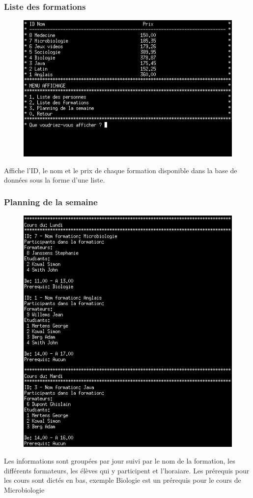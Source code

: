 \documentclass[11pt]{article}
\begin{document}
\subsubsection{Liste des formations}
\begin{figure}[ht]
  \centering
  \includegraphics[trim=0 60 0 0, clip, width=\textwidth]{images/04.png}
\end{figure}
Affiche l'ID, le nom et le prix de chaque formation disponible dans la base de données sous la forme d'une liste.

\newpage
\subsubsection{Planning de la semaine}
\begin{figure}[ht]
  \centering
  \includegraphics[width=\textwidth]{images/05.png}
\end{figure}
Les informations sont groupées par jour suivi par le nom de la formation, les différents formateurs, les élèves qui y participent et l'horaiare. Les prérequis pour les cours sont dictés en bas, exemple Biologie est un prérequis pour le cours de Microbiologie
\end{document}
